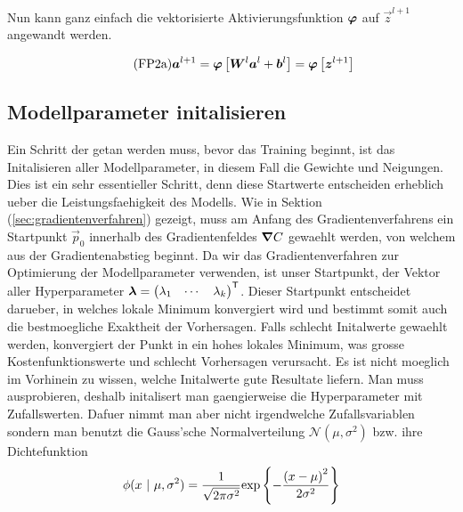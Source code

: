 Nun kann ganz einfach die vektorisierte Aktivierungsfunktion $\bm{\varphi}$ auf
$\vec{z}^{l+1}$ angewandt werden.

\begin{equation}\tag{FP2a}\label{eq:aktivierung_matrix}
  \bm{a}^{l+1} = \bm{\varphi} \left[\bm{W}^{l} \bm{a}^{l} + \bm{b}^{l} \right] = \bm{\varphi} \left[ \bm{z}^{l+1} \right]
\end{equation}

\para{}
\cite{Nielsen}

\subsection{Modellparameter initalisieren}\label{sec:parameter_initalisieren}
Ein Schritt der getan werden muss, bevor das Training beginnt, ist das
Initalisieren aller Modellparameter, in diesem Fall die Gewichte und Neigungen.
Dies ist ein sehr essentieller Schritt, denn diese Startwerte entscheiden
erheblich ueber die Leistungsfaehigkeit des Modells.
\para{}
Wie in Sektion (\ref{sec:gradientenverfahren}) gezeigt, muss am Anfang des
Gradientenverfahrens ein Startpunkt $\vec{p}_0$ innerhalb des Gradientenfeldes
$\bm{\nabla}C$ gewaehlt werden, von welchem aus der Gradientenabstieg beginnt.
Da wir das Gradientenverfahren zur Optimierung der Modellparameter verwenden,
ist unser Startpunkt, der Vektor aller Hyperparameter
$\bm{\lambda} = \begin{pmatrix} \lambda_1 & \cdots & \lambda_k \end{pmatrix}^{\mathsf{T}}$.
Dieser Startpunkt entscheidet darueber, in welches lokale Minimum konvergiert
wird und bestimmt somit auch die bestmoegliche Exaktheit der Vorhersagen. Falls
schlecht Initalwerte gewaehlt werden, konvergiert der Punkt in ein hohes lokales
Minimum, was grosse Kostenfunktionswerte und schlecht Vorhersagen verursacht.
\para{}
Es ist nicht moeglich im Vorhinein zu wissen, welche Initalwerte gute Resultate
liefern. Man muss ausprobieren, deshalb initalisert man gaengierweise die
Hyperparameter mit Zufallswerten. Dafuer nimmt man aber nicht irgendwelche
Zufallsvariablen sondern man benutzt die Gauss'sche Normalverteilung
$\mathcal{N}(\mu,\sigma^2)$ bzw. ihre Dichtefunktion
\[\ds \phi(x\ |\ \mu,\sigma^2) = \frac{1}{\sqrt{2\pi\sigma^2}} \text{exp} \left\{-\frac{{(x-\mu)}^2}{2\sigma^2}\right\} \]
\para{}

\ifcp
\pgfplotsset{compat=1.15}
\usetikzlibrary{arrows.meta}    %

